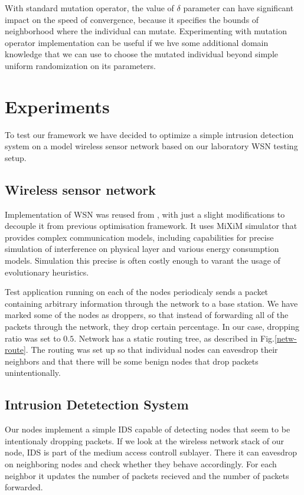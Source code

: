 \documentclass[12pt,oneside]{fithesis2}
\begin{document}
With standard mutation operator, the value of $\delta$ parameter can have significant impact on the speed of convergence, because it specifies the bounds of neighborhood where the individual can mutate. Experimenting with mutation operator implementation can be useful if we hve some additional domain knowledge that we can use to choose the mutated individual beyond simple uniform randomization on its parameters.


\chapter{Experiments}
\label{chap:exp}
To test our framework we have decided to optimize a simple intrusion detection system on a model wireless sensor network based on our laboratory WSN testing setup.

\section{Wireless sensor network}
Implementation of WSN was reused from \cite{stehl2013opt}, with just a slight modifications to decouple it from previous optimisation framework. It uses MiXiM simulator that provides complex communication models, including capabilities for precise simulation of interference on physical layer and various energy consumption models. Simulation this precise is often costly enough to varant the usage of evolutionary heuristics.

Test application running on each of the nodes periodicaly sends a packet containing arbitrary information through the network to a base station. 
We have marked some of the nodes as droppers, so that instead of forwarding all of the packets through the network, they drop certain percentage. In our case, dropping ratio was set to $0.5$. Network has a static routing tree, as described in Fig.\ref{netw-route}. The routing was set up so that individual nodes can eavesdrop their neighbors and that there will be some benign nodes that drop packets unintentionally.

\section{Intrusion Detetection System}
Our nodes implement a simple IDS capable of detecting nodes that seem to be intentionaly dropping packets.
If we look at the wireless network stack of our node, IDS is part of the medium access controll sublayer.
There it can eavesdrop on neighboring nodes and check whether they behave accordingly.
For each neighbor it updates the number of packets recieved and the number of packets forwarded.
\end{document}
